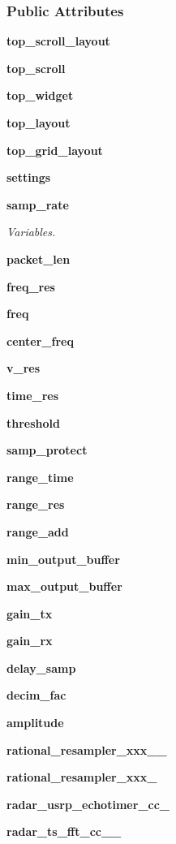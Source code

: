 \subsubsection*{Public Attributes}
\begin{DoxyCompactItemize}
\item 
{\bf top\+\_\+scroll\+\_\+layout}
\item 
{\bf top\+\_\+scroll}
\item 
{\bf top\+\_\+widget}
\item 
{\bf top\+\_\+layout}
\item 
{\bf top\+\_\+grid\+\_\+layout}
\item 
{\bf settings}
\item 
{\bf samp\+\_\+rate}
\begin{DoxyCompactList}\small\item\em Variables. \end{DoxyCompactList}\item 
{\bf packet\+\_\+len}
\item 
{\bf freq\+\_\+res}
\item 
{\bf freq}
\item 
{\bf center\+\_\+freq}
\item 
{\bf v\+\_\+res}
\item 
{\bf time\+\_\+res}
\item 
{\bf threshold}
\item 
{\bf samp\+\_\+protect}
\item 
{\bf range\+\_\+time}
\item 
{\bf range\+\_\+res}
\item 
{\bf range\+\_\+add}
\item 
{\bf min\+\_\+output\+\_\+buffer}
\item 
{\bf max\+\_\+output\+\_\+buffer}
\item 
{\bf gain\+\_\+tx}
\item 
{\bf gain\+\_\+rx}
\item 
{\bf delay\+\_\+samp}
\item 
{\bf decim\+\_\+fac}
\item 
{\bf amplitude}
\item 
{\bf rational\+\_\+resampler\+\_\+xxx\+\_\+\_}
\item 
{\bf rational\+\_\+resampler\+\_\+xxx\+\_}
\item 
{\bf radar\+\_\+usrp\+\_\+echotimer\+\_\+cc\+\_}
\item 
{\bf radar\+\_\+ts\+\_\+fft\+\_\+cc\+\_\+\_}
\item 

\end{DoxyCompactItemize}
